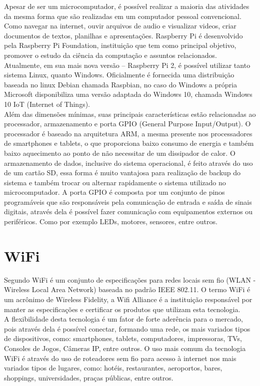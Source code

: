 Apesar de ser um microcomputador, é possível realizar a maioria das atividades da mesma forma que são realizadas em um computador pessoal convencional. Como navegar na internet, ouvir arquivos de audio e visualizar videos, criar documentos de textos, planilhas e apresentações. Raspberry Pi é desenvolvido pela Raspberry Pi Foundation, instituição que tem como principal objetivo, promover o estudo da ciência da computação e assuntos relacionados. \\
\indent Atualmente, em sua mais nova versão -- Raspberry Pi 2, é possível utilizar tanto sistema Linux, quanto Windows. Oficialmente é fornecida uma distribuição baseada no linux Debian chamada Raspbian, no caso do Windows a própria Microsoft disponibiliza uma versão adaptada do Windows 10, chamada Windows 10 IoT (Internet of Things). \\
\indent Além das dimensões mínimas, suas principais características estão relacionadas ao processador, armazenamento e porta GPIO (General Purpose Input/Output). O processador é baseado na arquitetura ARM, a mesma presente nos processadores de smartphones e tablets, o que proporciona baixo consumo de energia e também baixo aquecimento ao ponto de não necessitar de um dissipador de calor. O armazenamento de dados, inclusive do sistema operacional, é feito através do uso de um cartão SD, essa forma é muito vantajosa para realização de backup do sistema e também trocar ou alternar rapidamente o sistema utilizado no microcomputador. A porta GPIO é composta por um conjunto de pinos programáveis que são responsáveis pela comunicação de entrada e saída de sinais digitais, através dela é possível fazer comunicação com equipamentos externos ou periféricos. Como por exemplo LEDs, motores, sensores, entre outros.

\section{WiFi}
\label{sec:wifi}

Segundo \cite{Alecrim} WiFi é um conjunto de especificações para redes locais sem fio (WLAN - Wireless Local Area Network) baseada no padrão IEEE 802.11. O termo WiFi é um acrônimo de Wireless Fidelity, a Wifi Alliance é a instituição responsável por manter as especificações e certificar os produtos que utilizam esta tecnologia.\\
\indent A flexibilidade desta tecnologia é um fator de forte aderência para o mercado, pois através dela é possível conectar, formando uma rede, os mais variados tipos de dispositivos, como: smartphones, tablets, computadores, impressoras, TVs, Consoles de Jogos, Câmeras IP, entre outros. O uso mais comum da tecnologia WiFi é através do uso de roteadores sem fio para acesso à internet nos mais variados tipos de lugares, como: hotéis, restaurantes, aeroportos, bares, shoppings, universidades, praças públicas, entre outros.

